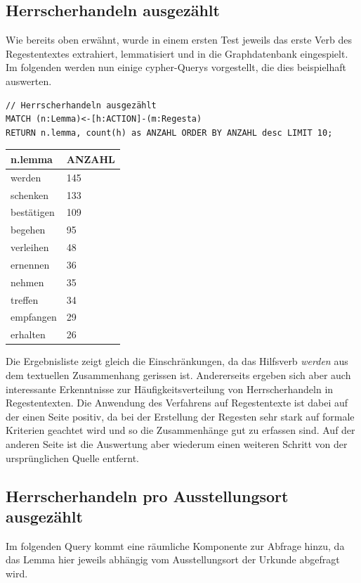 \documentclass[ngerman,]{scrreprt}
\begin{document}
\hypertarget{herrscherhandeln-ausgezuxe4hlt}{%
\subsection{Herrscherhandeln ausgezählt}\label{herrscherhandeln-ausgezuxe4hlt}}

Wie bereits oben erwähnt, wurde in einem ersten Test jeweils das erste Verb des Regestentextes extrahiert, lemmatisiert und in die Graphdatenbank eingespielt. Im folgenden werden nun einige cypher-Querys vorgestellt, die dies beispielhaft auswerten.

\begin{verbatim}
// Herrscherhandeln ausgezählt
MATCH (n:Lemma)<-[h:ACTION]-(m:Regesta)
RETURN n.lemma, count(h) as ANZAHL ORDER BY ANZAHL desc LIMIT 10;
\end{verbatim}

\begin{longtable}[]{@{}ll@{}}
\toprule
n.lemma & ANZAHL\tabularnewline
\midrule
\endhead
werden & 145\tabularnewline
schenken & 133\tabularnewline
bestätigen & 109\tabularnewline
begehen & 95\tabularnewline
verleihen & 48\tabularnewline
ernennen & 36\tabularnewline
nehmen & 35\tabularnewline
treffen & 34\tabularnewline
empfangen & 29\tabularnewline
erhalten & 26\tabularnewline
\bottomrule
\end{longtable}

Die Ergebnisliste zeigt gleich die Einschränkungen, da das Hilfsverb \emph{werden} aus dem textuellen Zusammenhang gerissen ist. Andererseits ergeben sich aber auch interessante Erkenntnisse zur Häufigkeitsverteilung von Herrscherhandeln in Regestentexten. Die Anwendung des Verfahrens auf Regestentexte ist dabei auf der einen Seite positiv, da bei der Erstellung der Regesten sehr stark auf formale Kriterien geachtet wird und so die Zusammenhänge gut zu erfassen sind. Auf der anderen Seite ist die Auswertung aber wiederum einen weiteren Schritt von der ursprünglichen Quelle entfernt.

\hypertarget{herrscherhandeln-pro-ausstellungsort-ausgezuxe4hlt}{%
\subsection{Herrscherhandeln pro Ausstellungsort ausgezählt}\label{herrscherhandeln-pro-ausstellungsort-ausgezuxe4hlt}}

Im folgenden Query kommt eine räumliche Komponente zur Abfrage hinzu, da das Lemma hier jeweils abhängig vom Ausstellungsort der Urkunde abgefragt wird.
\end{document}

